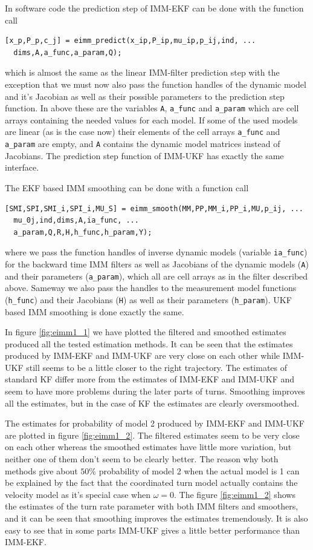 In software code the prediction step of IMM-EKF can be done with the
function call
%
\begin{lstlisting}
[x_p,P_p,c_j] = eimm_predict(x_ip,P_ip,mu_ip,p_ij,ind, ...
  dims,A,a_func,a_param,Q);
\end{lstlisting} which is almost the same as the linear IMM-filter
prediction step with the exception that we must now also pass the
function handles of the dynamic model and it's Jacobian as well as
their possible parameters to the prediction step function.  In above
these are the variables \texttt{A}, \texttt{a\_func} and
\texttt{a\_param} which are cell arrays containing the needed values
for each model. If some of the used models are linear (as is the case
now) their elements of the cell arrays \texttt{a\_func} and
\texttt{a\_param} are empty, and \texttt{A} contains the dynamic model
matrices instead of Jacobians. The prediction step function of IMM-UKF
has exactly the same interface.

The EKF based IMM smoothing can be done with a function call
%
\begin{lstlisting} 
[SMI,SPI,SMI_i,SPI_i,MU_S] = eimm_smooth(MM,PP,MM_i,PP_i,MU,p_ij, ...    
  mu_0j,ind,dims,A,ia_func, ...
  a_param,Q,R,H,h_func,h_param,Y);
\end{lstlisting}
%
where we pass the function handles of inverse dynamic models (variable
\texttt{ia\_func}) for the backward time IMM filters as well as
Jacobians of the dynamic models (\texttt{A}) and their parameters
(\texttt{a\_param}), which all are cell arrays as in the filter
described above. Sameway we also pass the handles to the measurement
model functions (\texttt{h\_func}) and their Jacobians (\texttt{H}) as
well as their parameters (\texttt{h\_param}). UKF based IMM smoothing
is done exactly the same.

In figure \ref{fig:eimm1_1} we have plotted the filtered and smoothed
estimates produced all the tested estimation methods. It can be seen
that the estimates produced by IMM-EKF and IMM-UKF are very close on
each other while IMM-UKF still seems to be a little closer to the
right trajectory. The estimates of standard KF differ more from the
estimates of IMM-EKF and IMM-UKF and seem to have more problems during
the later parts of turns. Smoothing improves all the estimates, but in
the case of KF the estimates are clearly oversmoothed.

The estimates for probability of model 2 produced by IMM-EKF and
IMM-UKF are plotted in figure \ref{fig:eimm1_2}. The filtered
estimates seem to be very close on each other whereas the smoothed
estimates have little more variation, but neither one of them don't
seem to be clearly better. The reason why both methods give about
$50\%$ probability of model 2 when the actual model is 1 can be
explained by the fact that the coordinated turn model actually
contains the velocity model as it's special case when $\omega =
0$. The figure \ref{fig:eimm1_2} shows the estimates of the turn rate
parameter with both IMM filters and smoothers, and it can be seen that
smoothing improves the estimates tremendously. It is also easy to see
that in some parts IMM-UKF gives a little better performance than
IMM-EKF.

